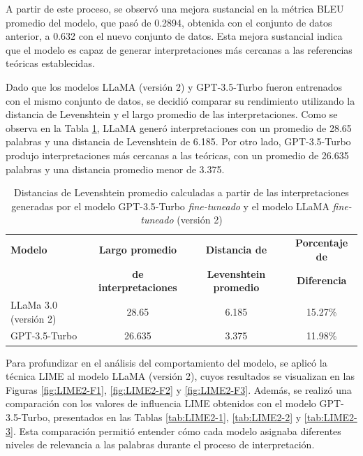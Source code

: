 A partir de este proceso, se observó una mejora sustancial en la métrica BLEU promedio del modelo, que pasó de 0.2894, obtenida con el conjunto de datos anterior, a 0.632 con el nuevo conjunto de datos. Esta mejora sustancial indica que el modelo es capaz de generar interpretaciones más cercanas a las referencias teóricas establecidas. 

Dado que los modelos LLaMA (versión 2) y GPT-3.5-Turbo fueron entrenados con el mismo conjunto de datos, se decidió comparar su rendimiento utilizando la distancia de Levenshtein y el largo promedio de las interpretaciones. Como se observa en la Tabla \ref{tab:LEVENSHTEIN-COMP}, LLaMA generó interpretaciones con un promedio de 28.65 palabras y una distancia de Levenshtein de 6.185. Por otro lado, GPT-3.5-Turbo produjo interpretaciones más cercanas a las teóricas, con un promedio de 26.635 palabras y una distancia promedio menor de 3.375.

\vspace{0.5cm}
\begin{table}[H]
\centering
    \begin{tabular}{|l|c|c|c|}
        \hline
        \textbf{Modelo} & \textbf{Largo promedio} & \textbf{Distancia de} & \textbf{Porcentaje de} \\ 
        & \textbf{de interpretaciones} & \textbf{Levenshtein promedio} & \textbf{Diferencia} \\ \hline

        LLaMa 3.0 (versión 2) & 28.65 & 6.185 & 15.27\%\\
        \hline
        GPT-3.5-Turbo & 26.635 & 3.375 & 11.98\%\\
        \hline
        
    \end{tabular}
    \caption{Distancias de Levenshtein promedio calculadas a partir de las interpretaciones generadas por el modelo GPT-3.5-Turbo \textit{fine-tuneado} y el modelo LLaMA \textit{fine-tuneado} (versión 2)}
    \label{tab:LEVENSHTEIN-COMP}
\end{table}

Para profundizar en el análisis del comportamiento del modelo, se aplicó la técnica LIME al modelo LLaMA (versión 2), cuyos resultados se visualizan en las Figuras \ref{fig:LIME2-F1}, \ref{fig:LIME2-F2} y \ref{fig:LIME2-F3}. Además, se realizó una comparación con los valores de influencia LIME obtenidos con el modelo GPT-3.5-Turbo, presentados en las Tablas \ref{tab:LIME2-1}, \ref{tab:LIME2-2} y \ref{tab:LIME2-3}. Esta comparación permitió entender cómo cada modelo asignaba diferentes niveles de relevancia a las palabras durante el proceso de interpretación.

